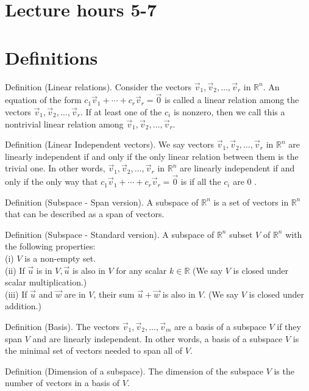 \documentclass[10pt]{article}
\begin{document}
\section*{Lecture hours 5-7}
\section*{Definitions}
Definition (Linear relations). Consider the vectors $\vec{v}_{1}, \vec{v}_{2}, \ldots, \vec{v}_{r}$ in $\mathbb{R}^{n}$. An equation of the form $c_{1} \vec{v}_{1}+\cdots+c_{r} \vec{v}_{r}=\overrightarrow{0}$ is called a linear relation among the vectors $\vec{v}_{1}, \vec{v}_{2}, \ldots, \vec{v}_{r}$. If at least one of the $c_{i}$ is nonzero, then we call this a nontrivial linear relation among $\vec{v}_{1}, \vec{v}_{2}, \ldots, \vec{v}_{r}$.

Definition (Linear Independent vectors). We say vectors $\vec{v}_{1}, \vec{v}_{2}, \ldots, \vec{v}_{r}$ in $\mathbb{R}^{n}$ are linearly independent if and only if the only linear relation between them is the trivial one. In other words, $\vec{v}_{1}, \vec{v}_{2}, \ldots, \vec{v}_{r}$ in $\mathbb{R}^{n}$ are linearly independent if and only if the only way that $c_{1} \vec{v}_{1}+\cdots+c_{r} \vec{v}_{r}=\overrightarrow{0}$ is if all the $c_{i}$ are 0 .

Definition (Subspace - Span version). A subspace of $\mathbb{R}^{n}$ is a set of vectors in $\mathbb{R}^{n}$ that can be described as a span of vectors.

Definition (Subspace - Standard version). A subspace of $\mathbb{R}^{n}$ subset $V$ of $\mathbb{R}^{n}$ with the following properties:\\
(i) $V$ is a non-empty set.\\
(ii) If $\vec{u}$ is in $V, \vec{u}$ is also in $V$ for any scalar $k \in \mathbb{R}$ (We say $V$ is closed under scalar multiplication.)\\
(iii) If $\vec{u}$ and $\vec{w}$ are in $V$, their sum $\vec{u}+\vec{w}$ is also in $V$. (We say $V$ is closed under addition.)

Definition (Basis). The vectors $\vec{v}_{1}, \vec{v}_{2}, \ldots, \vec{v}_{m}$ are a basis of a subspace $V$ if they span $V$ and are linearly independent. In other words, a basis of a subspace $V$ is the minimal set of vectors needed to span all of $V$.

Definition (Dimension of a subspace). The dimension of the subspace $V$ is the number of vectors in a basis of $V$.
\end{document}
